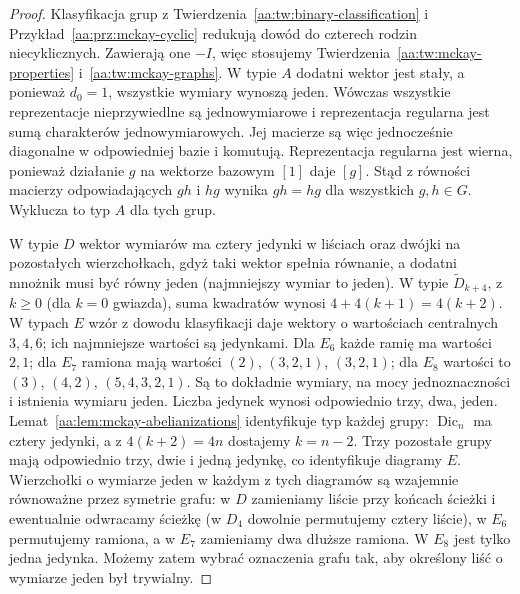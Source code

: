 \begin{proof}
Klasyfikacja grup z Twierdzenia~\ref{aa:tw:binary-classification}
i Przykład~\ref{aa:prz:mckay-cyclic} redukują dowód
do czterech rodzin niecyklicznych. Zawierają one $-I$,
więc stosujemy Twierdzenia~\ref{aa:tw:mckay-properties}
i~\ref{aa:tw:mckay-graphs}.
W typie $A$ dodatni wektor jest stały, a ponieważ
$d_0=1$, wszystkie wymiary wynoszą jeden.
Wówczas wszystkie reprezentacje nieprzywiedlne są
jednowymiarowe i reprezentacja regularna jest sumą
charakterów jednowymiarowych. Jej macierze są więc
jednocześnie diagonalne w odpowiedniej bazie i komutują.
Reprezentacja regularna jest wierna, ponieważ
działanie $g$ na wektorze bazowym $[1]$ daje $[g]$.
Stąd z równości macierzy odpowiadających $gh$ i $hg$
wynika $gh=hg$ dla wszystkich $g,h\in G$. Wyklucza to typ $A$ dla tych grup.

W typie $D$ wektor wymiarów ma cztery jedynki
w liściach oraz dwójki na pozostałych wierzchołkach,
gdyż taki wektor spełnia równanie, a dodatni mnożnik
musi być równy jeden (najmniejszy wymiar to jeden).
W typie $\widetilde D_{k+4}$, z $k\ge0$ (dla $k=0$
gwiazda), suma kwadratów wynosi $4+4(k+1)=4(k+2)$.
W typach $E$ wzór z dowodu klasyfikacji daje
wektory o wartościach centralnych $3,4,6$; ich
najmniejsze wartości są jedynkami. Dla $E_6$
każde ramię ma wartości $2,1$; dla $E_7$
ramiona mają wartości $(2)$, $(3,2,1)$, $(3,2,1)$;
dla $E_8$ wartości to $(3)$, $(4,2)$, $(5,4,3,2,1)$.
Są to dokładnie wymiary, na mocy jednoznaczności
i istnienia wymiaru jeden. Liczba jedynek wynosi
odpowiednio trzy, dwa, jeden.
Lemat~\ref{aa:lem:mckay-abelianizations}
identyfikuje typ każdej grupy: $\operatorname{Dic}_n$
ma cztery jedynki, a z $4(k+2)=4n$ dostajemy
$k=n-2$. Trzy pozostałe grupy mają odpowiednio trzy,
dwie i jedną jedynkę, co identyfikuje diagramy $E$.
Wierzchołki o wymiarze jeden w każdym z tych diagramów
są wzajemnie równoważne przez symetrie grafu:
w $D$ zamieniamy liście przy końcach ścieżki
i ewentualnie odwracamy ścieżkę (w $D_4$ dowolnie
permutujemy cztery liście), w $E_6$ permutujemy
ramiona, a w $E_7$ zamieniamy dwa dłuższe ramiona.
W $E_8$ jest tylko jedna jedynka.
Możemy zatem wybrać oznaczenia grafu tak,
aby określony liść o wymiarze jeden był trywialny.
\end{proof}

